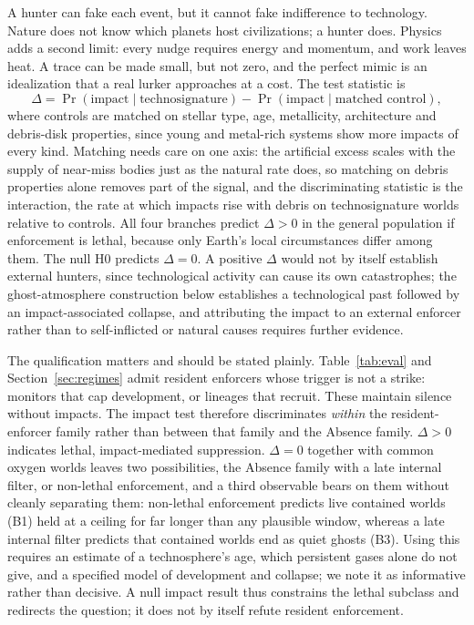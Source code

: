 \documentclass[preprint,12pt]{elsarticle}
\theoremstyle{definition}
\begin{document}
A hunter can fake each event, but it cannot fake indifference to technology. Nature does not know which planets host civilizations; a hunter does. Physics adds a second limit: every nudge requires energy and momentum, and work leaves heat. A trace can be made small, but not zero, and the perfect mimic is an idealization that a real lurker approaches at a cost. The test statistic is
\begin{equation}
\Delta = \Pr(\text{impact} \mid \text{technosignature}) - \Pr(\text{impact} \mid \text{matched control}),
\end{equation}
where controls are matched on stellar type, age, metallicity, architecture and debris-disk properties, since young and metal-rich systems show more impacts of every kind. Matching needs care on one axis: the artificial excess scales with the supply of near-miss bodies just as the natural rate does, so matching on debris properties alone removes part of the signal, and the discriminating statistic is the interaction, the rate at which impacts rise with debris on technosignature worlds relative to controls. All four branches predict $\Delta > 0$ in the general population if enforcement is lethal, because only Earth's local circumstances differ among them. The null H0 predicts $\Delta = 0$. A positive $\Delta$ would not by itself establish external hunters, since technological activity can cause its own catastrophes; the ghost-atmosphere construction below establishes a technological past followed by an impact-associated collapse, and attributing the impact to an external enforcer rather than to self-inflicted or natural causes requires further evidence.

The qualification matters and should be stated plainly. Table~\ref{tab:eval} and Section~\ref{sec:regimes} admit resident enforcers whose trigger is not a strike: monitors that cap development, or lineages that recruit. These maintain silence without impacts. The impact test therefore discriminates \emph{within} the resident-enforcer family rather than between that family and the Absence family. $\Delta > 0$ indicates lethal, impact-mediated suppression. $\Delta = 0$ together with common oxygen worlds leaves two possibilities, the Absence family with a late internal filter, or non-lethal enforcement, and a third observable bears on them without cleanly separating them: non-lethal enforcement predicts live contained worlds (B1) held at a ceiling for far longer than any plausible window, whereas a late internal filter predicts that contained worlds end as quiet ghosts (B3). Using this requires an estimate of a technosphere's age, which persistent gases alone do not give, and a specified model of development and collapse; we note it as informative rather than decisive. A null impact result thus constrains the lethal subclass and redirects the question; it does not by itself refute resident enforcement.
\end{document}
